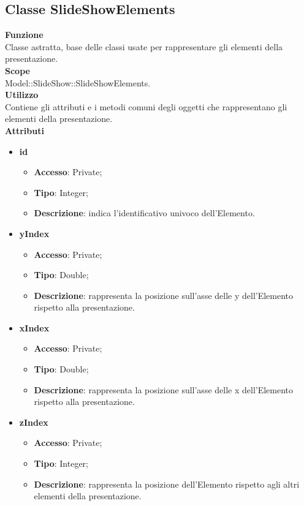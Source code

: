 	\subsection{Classe SlideShowElements}{
		\textbf{Funzione}\\
			\indent Classe astratta, base delle classi usate per rappresentare gli elementi della presentazione.\\
		\textbf{Scope}\\
			\indent Model::SlideShow::SlideShowElements.\\
		\textbf{Utilizzo}\\
			\indent Contiene gli attributi e i metodi comuni degli oggetti che rappresentano gli elementi della presentazione.\\
		\textbf{Attributi}
		\begin{itemize}
			\item \textbf{id}
			\begin{itemize}
				\item \textbf{Accesso}: Private;
				\item \textbf{Tipo}: Integer;
				\item \textbf{Descrizione}: indica l’identificativo univoco dell’Elemento.
			\end{itemize}
			\item \textbf{yIndex}
			\begin{itemize}
				\item \textbf{Accesso}: Private;
				\item \textbf{Tipo}: Double;
				\item \textbf{Descrizione}: rappresenta la posizione sull’asse delle y dell’Elemento rispetto alla presentazione.
			\end{itemize}
			\item \textbf{xIndex}
			\begin{itemize}
				\item \textbf{Accesso}: Private;
				\item \textbf{Tipo}: Double;
				\item \textbf{Descrizione}: rappresenta la posizione sull’asse delle x dell’Elemento rispetto alla presentazione.
			\end{itemize}
			\item \textbf{zIndex}
			\begin{itemize}
				\item \textbf{Accesso}: Private;
				\item \textbf{Tipo}: Integer;
				\item \textbf{Descrizione}: rappresenta la posizione dell’Elemento rispetto agli altri elementi della presentazione.

\end{itemize}
\end{itemize}}

